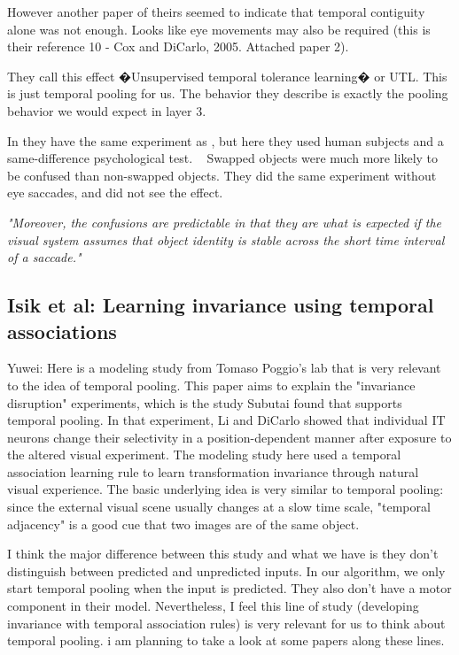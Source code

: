 \documentclass{article} %
\begin{document}
However another paper of theirs seemed to indicate that temporal contiguity
alone was not enough. Looks like eye movements may also be required (this is
their reference 10 - Cox and DiCarlo, 2005. Attached paper 2).

They call this effect �Unsupervised temporal tolerance learning� or UTL. This is
just temporal pooling for us.  The behavior they describe is exactly the pooling
behavior we would expect in layer 3.

In \cite{Cox2005} they have the same experiment as \cite{Li2008}, but
here they used human subjects and a same-difference psychological test.  
Swapped objects were much more likely to be confused than non-swapped objects.
They did the same experiment without eye saccades, and did not see the effect. 

\emph{"Moreover, the confusions are predictable in that they are what is
expected if the visual system assumes that object identity is stable across the short time
interval of a saccade."}


\subsection{Isik et al: Learning invariance using temporal associations}

Yuwei: Here \cite{Isik2012} is a modeling study from Tomaso Poggio's lab that
 is very
relevant to the idea of temporal pooling. This paper aims to explain the
"invariance disruption" experiments, which is the study Subutai found that
supports temporal pooling. In that experiment, Li and DiCarlo
\cite{Li2008} showed that
individual IT neurons change their selectivity in a position-dependent manner
after exposure to the altered visual experiment. The modeling study here used a
temporal association learning rule to learn transformation invariance through
natural visual experience. The basic underlying idea is very similar to temporal
pooling: since the external visual scene usually changes at a slow time scale,
"temporal adjacency" is a good cue that two images are of the same object.

I think the major difference between this study and what we have is they don't
distinguish between predicted and unpredicted inputs. In our algorithm, we only
start temporal pooling when the input is predicted. They also don't have a motor
component in their model. Nevertheless, I feel this line of study (developing
invariance with temporal association rules) is very relevant for us to think
about temporal pooling. i am planning to take a look at some papers along these
lines.
\end{document}
